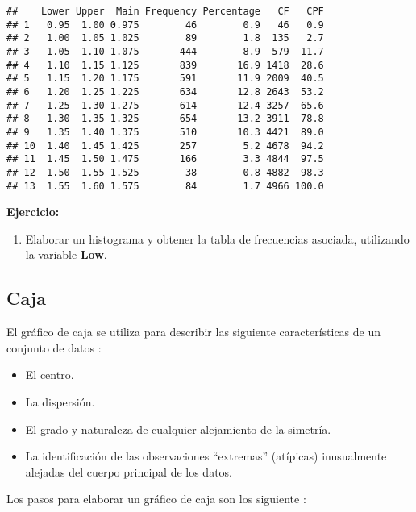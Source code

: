 \documentclass[
]{book}
\providecommand{\tightlist}{%
  \setlength{\itemsep}{0pt}\setlength{\parskip}{0pt}}
\begin{document}
\begin{verbatim}
##    Lower Upper  Main Frequency Percentage   CF   CPF
## 1   0.95  1.00 0.975        46        0.9   46   0.9
## 2   1.00  1.05 1.025        89        1.8  135   2.7
## 3   1.05  1.10 1.075       444        8.9  579  11.7
## 4   1.10  1.15 1.125       839       16.9 1418  28.6
## 5   1.15  1.20 1.175       591       11.9 2009  40.5
## 6   1.20  1.25 1.225       634       12.8 2643  53.2
## 7   1.25  1.30 1.275       614       12.4 3257  65.6
## 8   1.30  1.35 1.325       654       13.2 3911  78.8
## 9   1.35  1.40 1.375       510       10.3 4421  89.0
## 10  1.40  1.45 1.425       257        5.2 4678  94.2
## 11  1.45  1.50 1.475       166        3.3 4844  97.5
## 12  1.50  1.55 1.525        38        0.8 4882  98.3
## 13  1.55  1.60 1.575        84        1.7 4966 100.0
\end{verbatim}

\textbf{Ejercicio:}

\begin{enumerate}
\def\labelenumi{\arabic{enumi}.}
\tightlist
\item
  Elaborar un histograma y obtener la tabla de frecuencias asociada, utilizando la variable \textbf{Low}.
\end{enumerate}

\hypertarget{caja}{%
\subsection{Caja}\label{caja}}

El gráfico de caja se utiliza para describir las siguiente características de un conjunto de datos \citep[página 35]{Devore}:

\begin{itemize}
\tightlist
\item
  El centro.
\item
  La dispersión.
\item
  El grado y naturaleza de cualquier alejamiento de la simetría.
\item
  La identificación de las observaciones ``extremas'' (atípicas) inusualmente alejadas del cuerpo principal de los datos.
\end{itemize}

Los pasos para elaborar un gráfico de caja son los siguiente \citep[página 106]{anderson}:
\end{document}

